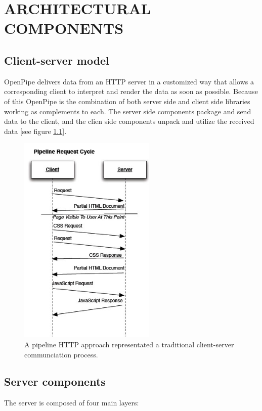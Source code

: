 \documentclass[12pt]{report}
\begin{document}
\chapter{ARCHITECTURAL COMPONENTS}

\section{Client-server model}

OpenPipe delivers data from an HTTP server in a customized way that allows a corresponding client to interpret and render the data as soon as possible. Because of this OpenPipe is the combination of both server side and client side libraries working as complements to each. The server side components package and send data to the client, and the clien side components unpack and utilize the received data [see figure \ref{fig:pipelinedRequestCycle}].

\begin{figure}[H]
\label{fig:pipelinedRequestCycle}
\centering
\includegraphics[width=65mm]{figures/images/pipeline_request_cycle.png}
\caption{A pipeline HTTP approach representated a traditional client-server communciation process.}
\end{figure}




\section{Server components}

The server is composed of four main layers:
\end{document}
